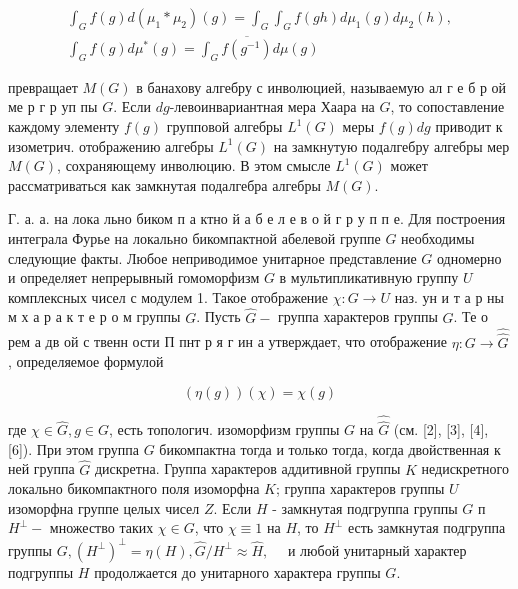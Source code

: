 \documentclass[10pt]{article}
\begin{document}
\[

\begin{gathered}

\int_{G} f(g) d\left(\mu_{1} * \mu_{2}\right)(g)=\int_{G} \int_{G} f(g h) d \mu_{1}(g) d \mu_{2}(h), \\

\int_{G} f(g) d \mu^{*}(g)=\int_{G} \overline{f\left(g^{-1}\right)} d \mu(g)

\end{gathered}

\]



превращает $M(G)$ в банахову алгебру с инволюцией, называемую ал г е б р ой ме р г р уп пы $G$. Если $d g$-левоинвариантная мера Хаара на $G$, то сопоставление каждому элементу $f(g)$ групповой алгебры $L^{1}(G)$ меры $f(g) d g$ приводит к изометрич. отображению алгебры $L^{1}(G)$ на замкнутую подалгебру алгебры мер $M(G)$, сохраняющему инволюцию. В этом смысле $L^{1}(G)$ может рассматриваться как замкнутая подалгебра алгебры $M(G)$.



Г. а. а. на лока льно биком п а ктно й а б е л е в о й г р у п п е. Для построения интеграла Фурье на локально бикомпактной абелевой группе $G$ необходимы следующие факты. Любое неприводимое унитарное представление $G$ одномерно и определяет непрерывный гомоморфизм $G$ в мультипликативную группу $U$ комплексных чисел с модулем 1. Такое отображение $\chi: G \rightarrow U$ наз. ун и т а р ны м х а р а к т е р о м группы $G$. Пусть $\widehat{G}-$ группа характеров группы $G$. Те о рем а дв ой с твенн ости П пнт р я г ин а утверждает, что отображение $\eta: G \rightarrow \hat{\widehat{G}}$, определяемое формулой



\[

(\eta(g))(\chi)=\chi(g)

\]



где $\chi \in \hat{G}, g \in G$, есть топологич. изоморфизм группы $G$ на $\widehat{\hat{G}}$ (см. [2], [3], [4], [6]). При этом группа $G$ бикомпактна тогда и только тогда, когда двойственная к ней группа $\hat{G}$ дискретна. Группа характеров аддитивной группы $K$ недискретного локально бикомпактного поля изоморфна $K$; группа характеров группы $U$ изоморфна группе целых чисел $Z$. Если $H$ - замкнутая подгруппа группы $G$ п $H^{\perp}-$ множество таких $\chi \in G$, что $\chi \equiv 1$ на $H$, то $H^{\perp}$ есть замкнутая подгруппа группы $G,\left(H^{\perp}\right)^{\perp}=\eta(H), \widehat{G} / H^{\perp} \approx \hat{H}, \quad$ и любой унитарный характер подгруппы $H$ продолжается до унитарного характера группы $G$.
\end{document}
